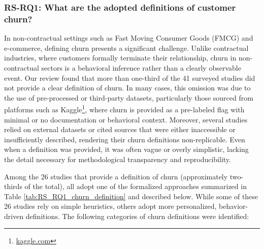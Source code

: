 \documentclass[preprint,12pt]{elsarticle}
\newcommand{\RSRQone}{RS-RQ1: What are the adopted definitions of customer churn?}
\begin{document}


\subsubsection{\RSRQone}
\label{sec:RQ1}

In non-contractual settings such as Fast Moving Consumer Goods (FMCG) and e-commerce, defining churn presents a significant challenge. Unlike contractual industries, where customers formally terminate their relationship, churn in non-contractual sectors is a behavioral inference rather than a clearly observable event. Our review found that more than one-third of the 41 surveyed studies did not provide a clear definition of churn. In many cases, this omission was due to the use of pre-processed or third-party datasets, particularly those sourced from platforms such as Kaggle\footnote{\url{kaggle.com}}, where churn is provided as a pre-labeled flag with minimal or no documentation or behavioral context. Moreover, several studies relied on external datasets or cited sources that were either inaccessible or insufficiently described, rendering their churn definitions non-replicable. Even when a definition was provided, it was often vague or overly simplistic, lacking the detail necessary for methodological transparency and reproducibility.





Among the 26 studies that provide a definition of churn (approximately two-thirds of the total), all adopt one of the formalized approaches summarized in Table \ref{tab:RS_RQ1_churn_definition} and described below. While some of these 26 studies rely on simple heuristics, others adopt more personalized, behavior-driven definitions. The following categories of churn definitions were identified:
\end{document}
